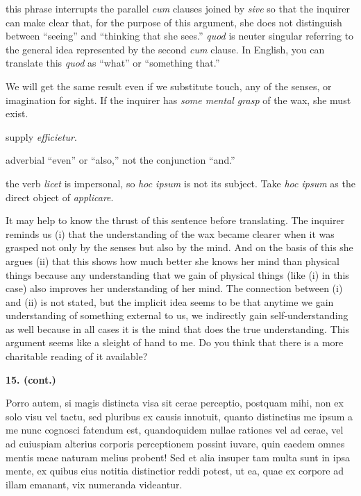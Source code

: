  this phrase interrupts the parallel \textit{cum} clauses joined by \textit{sive} so that the inquirer can make clear that, for the purpose of this argument, she does not distinguish between ``seeing'' and ``thinking that she sees.'' \textit{quod} is neuter singular referring to the general idea represented by the second \textit{cum} clause. In English, you can translate this \textit{quod} as ``what'' or ``something that.''

 We will get the same result even if we substitute touch, any of the senses, or imagination for sight. If the inquirer has \textit{some mental grasp} of the wax, she must exist.

 supply \textit{efficietur}.

 adverbial ``even'' or ``also,'' not the conjunction ``and.''

 the verb \textit{licet} is impersonal, so \textit{hoc ipsum} is not its subject. Take \textit{hoc ipsum} as the direct object of \textit{applicare}.

 It may help to know the thrust of this sentence before translating. The inquirer reminds us (i) that the understanding of the wax became clearer when it was grasped not only by the senses but also by the mind. And on the basis of this she argues (ii) that this shows how much better she knows her mind than physical things because any understanding that we gain of physical things (like (i) in this case) also improves her understanding of her mind. The connection between (i) and (ii) is not stated, but the implicit idea seems to be that anytime we gain understanding of something external to us, we indirectly gain self-understanding as well because in all cases it is the mind that does the true understanding. This argument seems like a sleight of hand to me. Do you think that there is a more charitable reading of it available?

\clearpage

\beginnumbering
{}
\pstart
    \textbf{15. (cont.)} \begin{latin}Porro autem, si magis distincta visa sit cerae perceptio, postquam mihi, non ex solo visu vel tactu, sed pluribus ex causis innotuit, quanto distinctius me ipsum a me nunc cognosci fatendum est, quandoquidem nullae rationes vel ad cerae, vel ad cuiuspiam alterius corporis perceptionem possint iuvare, quin eaedem omnes mentis meae naturam melius probent! Sed et alia insuper tam multa sunt in ipsa mente, ex quibus eius notitia distinctior reddi potest, ut ea, quae ex corpore ad illam emanant, vix numeranda videantur.\end{latin}
\pend
\endnumbering

